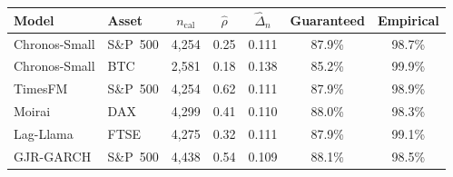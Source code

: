 \begin{tabular}{@{}llccccc@{}}
\toprule
Model & Asset & $n_{\mathrm{cal}}$ & $\hat\rho$ & $\hat\Delta_n$ & Guaranteed & Empirical \\
\midrule
		Chronos-Small & S\&P~500 & 4{,}254 & 0.25 & 0.111 & 87.9\% & 98.7\% \\
		Chronos-Small & BTC & 2{,}581 & 0.18 & 0.138 & 85.2\% & 99.9\% \\
		TimesFM & S\&P~500 & 4{,}254 & 0.62 & 0.111 & 87.9\% & 98.9\% \\
		Moirai & DAX & 4{,}299 & 0.41 & 0.110 & 88.0\% & 98.3\% \\
		Lag-Llama & FTSE & 4{,}275 & 0.32 & 0.111 & 87.9\% & 99.1\% \\
		GJR-GARCH & S\&P~500 & 4{,}438 & 0.54 & 0.109 & 88.1\% & 98.5\% \\
\bottomrule
\end{tabular}
